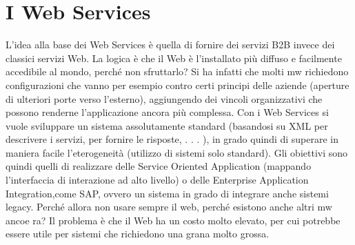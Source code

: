\section{I Web Services}
L'idea alla base dei Web Services è quella di fornire dei servizi B2B invece dei
classici servizi Web. La logica è che il Web è l'installato più diffuso e facilmente
accedibile al mondo, perché non sfruttarlo?
Si ha infatti che molti mw richiedono configurazioni che vanno per esempio
contro certi principi delle aziende (aperture di ulteriori porte verso l'esterno),
aggiungendo dei vincoli organizzativi che possono renderne l'applicazione ancora
più complessa.
Con i Web Services si vuole sviluppare un sistema assolutamente standard
(basandosi su XML per descrivere i servizi, per fornire le risposte, . . . ), in grado quindi di superare in maniera
facile l'eterogeneità (utilizzo di sistemi solo
standard). Gli obiettivi sono quindi quelli di realizzare delle Service Oriented
Application (mappando l'interfaccia di interazione ad alto livello) o delle Enterprise Application Integration,come SAP,
ovvero un sistema in grado di integrare
anche sistemi legacy.
Perché allora non usare sempre il web, perché esistono anche altri mw ancoe
ra? Il problema è che il Web ha un costo molto elevato, per cui potrebbe essere
utile per sistemi che richiedono una grana molto grossa.
